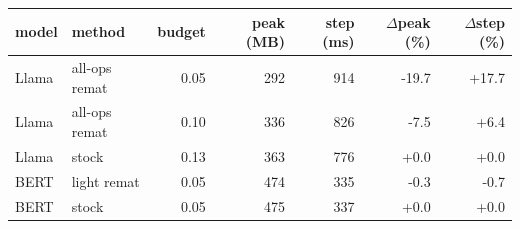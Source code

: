 \begin{tabular}{llrrrrr}
\toprule
model & method & budget & peak (MB) & step (ms) & $\Delta$peak (\%) & $\Delta$step (\%) \\
\midrule
Llama & all-ops remat & 0.05 & 292 & 914 & -19.7 & +17.7 \\
Llama & all-ops remat & 0.10 & 336 & 826 & -7.5 & +6.4 \\
Llama & stock & 0.13 & 363 & 776 & +0.0 & +0.0 \\
\midrule
BERT & light remat & 0.05 & 474 & 335 & -0.3 & -0.7 \\
BERT & stock & 0.05 & 475 & 337 & +0.0 & +0.0 \\
\bottomrule
\end{tabular}
